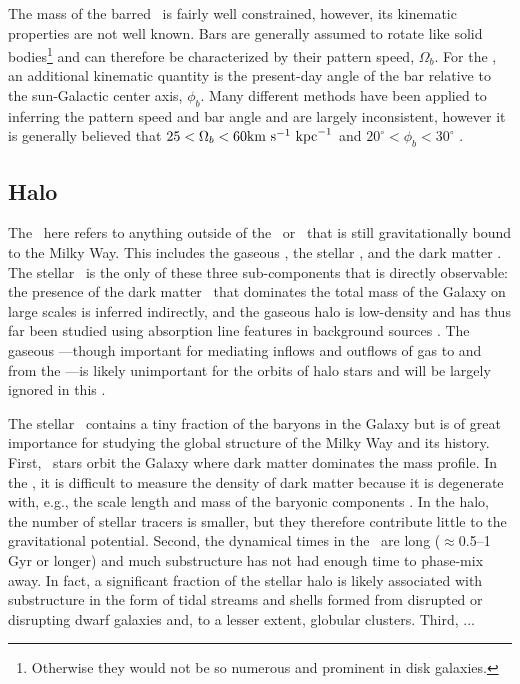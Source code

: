 The mass of the barred \mwbulge\ is fairly well constrained, however, its kinematic properties are not well known. Bars are generally assumed to rotate like solid bodies\footnote{Otherwise they would not be so numerous and prominent in disk galaxies.} and can therefore be characterized by their pattern speed, $\Omega_b$. For the \mwbulge, an additional kinematic quantity is the present-day angle of the bar relative to the sun-Galactic center axis, $\phi_b$. Many different methods have been applied to inferring the pattern speed and bar angle and are largely inconsistent, however it is generally believed that $25 < \Omega_b < 60 \mathrm{km}~\mathrm{s}^{-1}~\mathrm{kpc}^{-1}$ and $20^\circ < \phi_b < 30^\circ$ \citep{dwek95, stanek97, debattista02, shen10, wegg13, cao13, wegg15, portail15}.


\subsection{Halo} 

The \mwhalo\ here refers to anything outside of the \mwdisk\ or \mwbulge\ that is still gravitationally bound to the Milky Way. This includes the gaseous \mwhalo, the stellar \mwhalo, and the dark matter \mwhalo. The stellar \mwhalo\ is the only of these three sub-components that is directly observable: the presence of the dark matter \mwhalo\ that dominates the total mass of the Galaxy on large scales \citep[$M_{\rm h:d} \approx 10^{12}~\msun$;][]{todo} is inferred indirectly, and the gaseous halo is low-density and has thus far been studied using absorption line features in background sources \citep{miller13}. The gaseous \mwhalo---though important for mediating inflows and outflows of gas to and from the \mwdisk---is likely unimportant for the orbits of halo stars \citep[$M_{\rm h:g} \approx 10^{10}~\msun$][]{blitz10, salem15} and will be largely ignored in this \article. 

The stellar \mwhalo\ contains a tiny fraction of the baryons in the Galaxy \citep[$\approx$1\%][]{todo} but is of great importance for studying the global structure of the Milky Way and its history. First, \mwhalo\ stars orbit the Galaxy where dark matter dominates the mass profile. In the \mwdisk, it is difficult to measure the density of dark matter because it is degenerate with, e.g., the scale length and mass of the baryonic components \citep{todo many}. In the halo, the number of stellar tracers is smaller, but they therefore contribute little to the gravitational potential. Second, the dynamical times in the \mwhalo\ are long ($\approx$0.5--1 Gyr or longer) and much substructure has not had enough time to phase-mix away. In fact, a significant fraction  of the stellar halo is likely associated with substructure in the form of tidal streams and shells formed from disrupted or disrupting dwarf galaxies and, to a lesser extent, globular clusters. Third, ...

